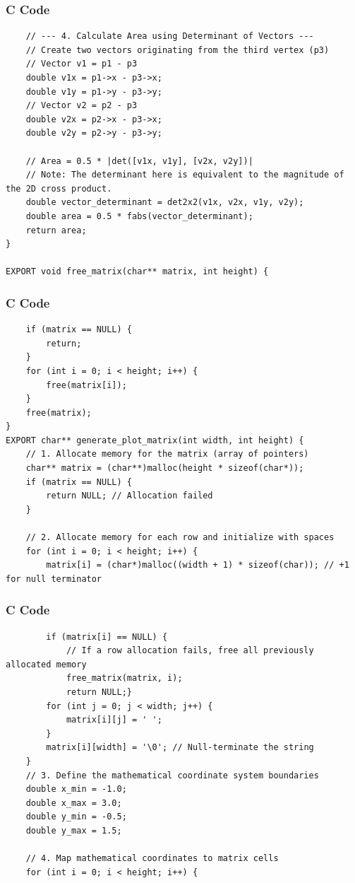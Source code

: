 \documentclass{beamer}
\begin{document}
\begin{frame}[fragile]
\frametitle{C Code }
\begin{lstlisting}
    // --- 4. Calculate Area using Determinant of Vectors ---
    // Create two vectors originating from the third vertex (p3)
    // Vector v1 = p1 - p3
    double v1x = p1->x - p3->x;
    double v1y = p1->y - p3->y;
    // Vector v2 = p2 - p3
    double v2x = p2->x - p3->x;
    double v2y = p2->y - p3->y;

    // Area = 0.5 * |det([v1x, v1y], [v2x, v2y])|
    // Note: The determinant here is equivalent to the magnitude of the 2D cross product.
    double vector_determinant = det2x2(v1x, v2x, v1y, v2y);
    double area = 0.5 * fabs(vector_determinant);
    return area;
}

EXPORT void free_matrix(char** matrix, int height) {
\end{lstlisting}    
\end{frame}
\begin{frame}[fragile]
\frametitle{C Code }
\begin{lstlisting}
    if (matrix == NULL) {
        return;
    }
    for (int i = 0; i < height; i++) {
        free(matrix[i]);
    }
    free(matrix);
}
EXPORT char** generate_plot_matrix(int width, int height) {
    // 1. Allocate memory for the matrix (array of pointers)
    char** matrix = (char**)malloc(height * sizeof(char*));
    if (matrix == NULL) {
        return NULL; // Allocation failed
    }

    // 2. Allocate memory for each row and initialize with spaces
    for (int i = 0; i < height; i++) {
        matrix[i] = (char*)malloc((width + 1) * sizeof(char)); // +1 for null terminator
        \end{lstlisting}    
\end{frame}
\begin{frame}[fragile]
\frametitle{C Code }
\begin{lstlisting}
        if (matrix[i] == NULL) {
            // If a row allocation fails, free all previously allocated memory
            free_matrix(matrix, i);
            return NULL;}
        for (int j = 0; j < width; j++) {
            matrix[i][j] = ' ';
        }
        matrix[i][width] = '\0'; // Null-terminate the string
    }
    // 3. Define the mathematical coordinate system boundaries
    double x_min = -1.0;
    double x_max = 3.0;
    double y_min = -0.5;
    double y_max = 1.5;

    // 4. Map mathematical coordinates to matrix cells
    for (int i = 0; i < height; i++) {
    \end{lstlisting}    
\end{frame}
\end{document}
